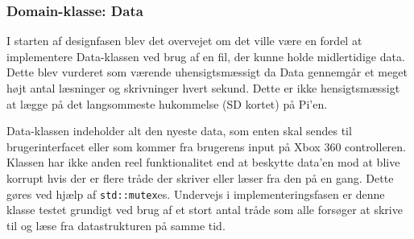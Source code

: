 \subsubsection{Domain-klasse: Data} \label{sec:data_klasse}
I starten af designfasen blev det overvejet om det ville være en fordel at implementere Data-klassen ved brug af en fil, der kunne holde midlertidige data.
Dette blev vurderet som værende uhensigtsmæssigt da Data gennemgår et meget højt antal læsninger og skrivninger hvert sekund.
Dette er ikke hensigtsmæssigt at lægge på det langsommeste hukommelse (SD kortet) på Pi'en.

Data-klassen indeholder alt den nyeste data, som enten skal sendes til brugerinterfacet eller som kommer fra brugerens input på Xbox 360 controlleren. Klassen har ikke anden reel funktionalitet end at beskytte data'en mod at blive korrupt hvis der er flere tråde der skriver eller læser fra den på en gang. Dette gøres ved hjælp af \texttt{std::mutex}es. Undervejs i implementeringsfasen er denne klasse testet grundigt ved brug af et stort antal tråde som alle forsøger at skrive til og læse fra datastrukturen på samme tid.